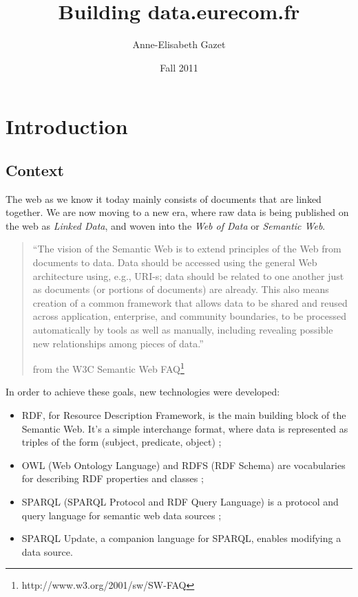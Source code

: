 \documentclass[a4paper,11pt]{report}
\title{Building data.eurecom.fr}
\author{Anne-Elisabeth Gazet}
\date{Fall 2011}
\begin{document}
\maketitle

\chapter*{Introduction}

\section*{Context}
The web as we know it today mainly consists of documents that are linked together. We are now moving to a new era, where raw data is being published on the web as \emph{Linked Data}, and woven into the \emph{Web of Data} or \emph{Semantic Web}. 
\begin{quotation}
``The vision of the Semantic Web is to extend principles of the Web from documents to data. Data should be accessed using the general Web architecture using, e.g., URI-s; data should be related to one another just as documents (or portions of documents) are already. This also means creation of a common framework that allows data to be shared and reused across application, enterprise, and community boundaries, to be processed automatically by tools as well as manually, including revealing possible new relationships among pieces of data.''
\begin{flushright}
from the W3C Semantic Web FAQ\footnote{http://www.w3.org/2001/sw/SW-FAQ}
\end{flushright}
\end{quotation}
In order to achieve these goals, new technologies were developed:
\begin{itemize}
\item RDF, for Resource Description Framework, is the main building block of the Semantic Web. It's a simple interchange format, where data is represented as triples of the form (subject, predicate, object) ;
\item OWL (Web Ontology Language) and RDFS (RDF Schema) are vocabularies for describing RDF properties and classes ;
\item SPARQL (SPARQL Protocol and RDF Query Language) is a protocol and query language for semantic web data sources ;
\item SPARQL Update, a companion language for SPARQL, enables modifying a data source. %
\end{itemize}
\end{document}

